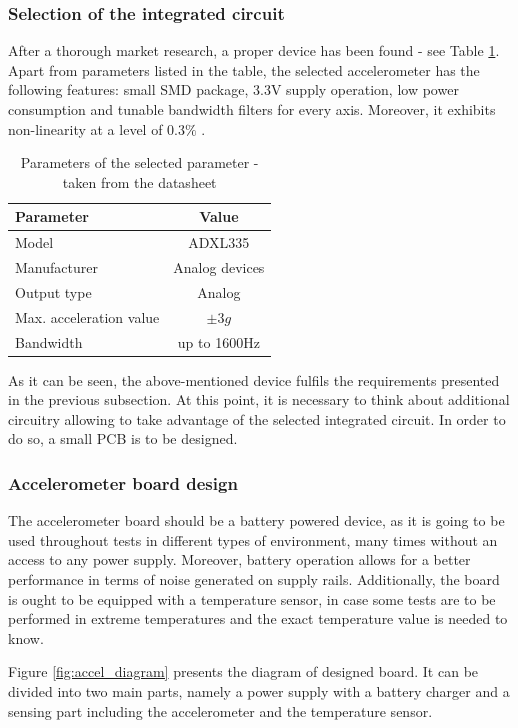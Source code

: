 \documentclass[12pt,a4paper]{article}
\begin{document}
\subsubsection{Selection of the integrated circuit}
After a thorough market research, a proper device has been found - see Table \ref{tab:adxl_params}. Apart from parameters listed in the table, the selected accelerometer has the following features: small SMD package, 3.3V supply operation, low power consumption and tunable bandwidth filters for every axis. Moreover, it exhibits non-linearity at a level of 0.3$\%$ \cite{ADXL}.
\par

\begin{table}[ht!]
\begin{tabular}{|l|c|}
\hline
\textbf{Parameter}		& \textbf{Value} 	\\ \hline
Model  					& ADXL335         	\\ \hline
Manufacturer        	& Analog devices	\\ \hline
Output type           	& Analog  			\\ \hline
Max. acceleration value &  $\pm{3}g$		\\ \hline
Bandwidth 				&  up to 1600Hz		\\ \hline
\end{tabular}
\caption{Parameters of the selected parameter - taken from the datasheet \cite{ADXL}}
\label{tab:adxl_params}
\end{table}

As it can be seen, the above-mentioned device fulfils the requirements presented in the previous subsection. At this point, it is necessary to think about additional circuitry allowing to take advantage of the selected integrated circuit. In order to do so, a small PCB is to be designed.
\par

\subsubsection{Accelerometer board design}
The accelerometer board should be a battery powered device, as it is going to be used throughout tests in different types of environment, many times without an access to any power supply. Moreover, battery operation allows for a better performance in terms of noise generated on supply rails. Additionally, the board is ought to be equipped with a temperature sensor, in case some tests are to be performed in extreme temperatures and the exact temperature value is needed to know.
\par
Figure \ref{fig:accel_diagram} presents the diagram of designed board. It can be divided into two main parts, namely a power supply with a battery charger and a sensing part including the accelerometer and the temperature sensor.
\par
\end{document}
